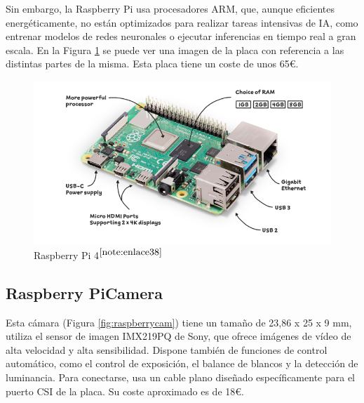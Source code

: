 Sin embargo, la Raspberry Pi usa procesadores ARM, que, aunque eficientes energéticamente, no están optimizados para realizar tareas intensivas de \ac{IA}, como entrenar modelos de redes neuronales o ejecutar inferencias en tiempo real a gran escala. En la Figura \ref{fig:raspberry} se puede ver una imagen de la placa con referencia a las distintas partes de la misma. Esta placa tiene un coste de unos 65€. 


\begin{figure} [h!]
	\begin{center}
		\includegraphics[width=14cm]{figs/raspberrypi4.png}
	\end{center}
	\caption{Raspberry Pi 4$^{\ref{note:enlace38}}$} 
\label{fig:raspberry}
\end{figure}

\setcounter{footnote}{38} %

\subsection{Raspberry PiCamera}
\label{subsec:picamera}

Esta cámara (Figura \ref{fig:raspberrycam}) tiene un tamaño de 23,86 x 25 x 9 mm, utiliza el sensor de imagen IMX219PQ de Sony, que ofrece imágenes de vídeo de alta velocidad y alta sensibilidad. Dispone también de funciones de control automático, como el control de exposición, el balance de blancos y la detección de luminancia. Para conectarse, usa un cable plano diseñado específicamente para el puerto \ac{CSI} de la placa. Su coste aproximado es de 18€. 




